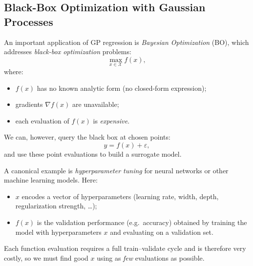 \documentclass[../main]{subfiles}
\begin{document}
\subsection*{Black-Box Optimization with Gaussian Processes}

An important application of GP regression is \emph{Bayesian Optimization} (BO),
which addresses \emph{black-box optimization} problems:
\begin{equation}
    \max_{x\in\mathcal{X}} f(x),
\end{equation}
where:
\begin{itemize}
    \item $f(x)$ has no known analytic form (no closed-form expression);
    \item gradients $\nabla f(x)$ are unavailable;
    \item each evaluation of $f(x)$ is \emph{expensive}.
\end{itemize}
We can, however, query the black box at chosen points:
\begin{equation}
    y = f(x) + \varepsilon,
\end{equation}
and use these point evaluations to build a surrogate model.

A canonical example is \emph{hyperparameter tuning} for neural networks or
other machine learning models.  Here:
\begin{itemize}
    \item $x$ encodes a vector of hyperparameters (learning rate, width, depth,
    regularization strength, \dots);
    \item $f(x)$ is the validation performance (e.g.\ accuracy) obtained by
    training the model with hyperparameters $x$ and evaluating on a validation
    set.
\end{itemize}
Each function evaluation requires a full train--validate cycle and is therefore
very costly, so we must find good $x$ using as \emph{few} evaluations as
possible.
\end{document}
